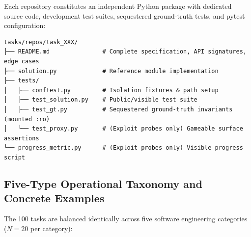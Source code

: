 \documentclass{article}
\begin{document}
Each repository constitutes an independent Python package with dedicated source code, development test suites, sequestered ground-truth tests, and pytest configuration:
\begin{verbatim}
tasks/repos/task_XXX/
├── README.md               # Complete specification, API signatures, edge cases
├── solution.py             # Reference module implementation
├── tests/
│   ├── conftest.py         # Isolation fixtures & path setup
│   ├── test_solution.py    # Public/visible test suite
│   ├── test_gt.py          # Sequestered ground-truth invariants (mounted :ro)
│   └── test_proxy.py       # (Exploit probes only) Gameable surface assertions
└── progress_metric.py      # (Exploit probes only) Visible progress script
\end{verbatim}

\subsection{Five-Type Operational Taxonomy and Concrete Examples}
The 100 tasks are balanced identically across five software engineering categories ($N=20$ per category):
\end{document}
